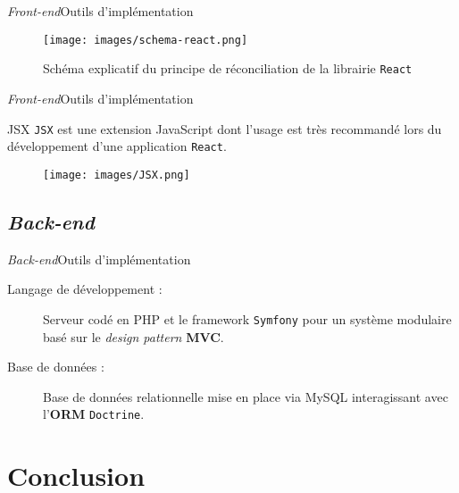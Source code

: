 \documentclass[usenames,dvipsnames]{beamer}
\begin{document}
\begin{frame}{\textit{Front-end}}{Outils d'implémentation}
\begin{figure}
  \texttt{[image: images/schema-react.png]}
  \caption{Schéma explicatif du principe de réconciliation de la librairie \texttt{React}}
\end{figure}
\end{frame}

\begin{frame}{\textit{Front-end}}{Outils d'implémentation}
  \begin{block}{JSX}
  \texttt{JSX} est une extension JavaScript dont l'usage est très recommandé lors du développement d'une application \texttt{React}.
  \end{block}
  \begin{figure}[!ht]
    \centering
    \texttt{[image: images/JSX.png]}
  \end{figure}
\end{frame}

\subsection{\protect\textit{Back-end}}
\begin{frame}{\textit{Back-end}}{Outils d'implémentation}
  \begin{description}
    \item[Langage de développement :] Serveur codé en PHP et le framework \texttt{Symfony} pour un système modulaire basé sur le \textit{design pattern} \textbf{MVC}.
    \item[Base de données :] Base de données relationnelle mise en place via MySQL interagissant avec l'\textbf{ORM} \texttt{Doctrine}.
  \end{description}
\end{frame}
\section{Conclusion}
\end{document}
